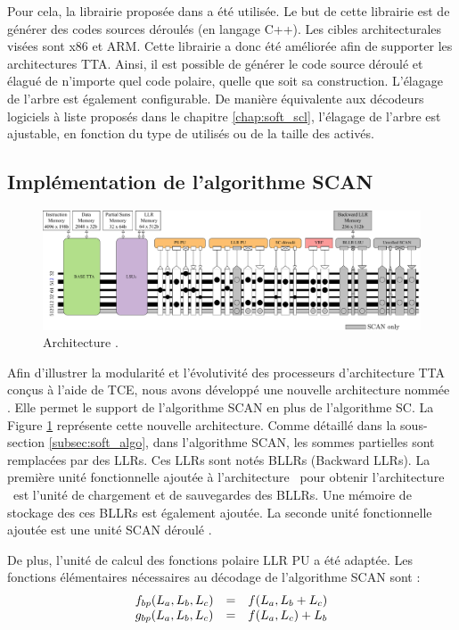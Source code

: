 Pour cela, la librairie proposée dans \cite{cassagne_efficient_2015} a été utilisée. Le but de cette librairie est de générer des codes sources déroulés (en langage C++). Les cibles architecturales visées sont x86 et ARM. Cette librairie a donc été améliorée afin de supporter les architectures TTA. Ainsi, il est possible de générer le code source déroulé et élagué de n'importe quel code polaire, quelle que soit sa construction. L'élagage de l'arbre est également configurable. De manière équivalente aux décodeurs logiciels à liste proposés dans le chapitre \ref{chap:soft_scl}, l'élagage de l'arbre est ajustable, en fonction du type de \noeuds utilisés ou de la taille des \noeuds activés.


\subsection{Implémentation de l'algorithme SCAN}

\begin{figure}[t]
	\centering
	\includegraphics[width=\textwidth]{main/ch4_fig/archi_scan}
	\caption{Architecture \TTSCAN.}
	\label{fig:tt_scan}
\end{figure}

Afin d'illustrer la modularité et l'évolutivité des processeurs d'architecture TTA conçus à l'aide de TCE, nous avons développé une nouvelle architecture nommée \TTSCAN. Elle permet le support de l'algorithme SCAN en plus de l'algorithme SC. La Figure \ref{fig:tt_scan} représente cette nouvelle architecture.
Comme détaillé dans la sous-section \ref{subsec:soft_algo}, dans l'algorithme SCAN, les sommes partielles sont remplacées par des LLRs. Ces LLRs sont notés BLLRs (Backward LLRs). La première unité fonctionnelle ajoutée à l'architecture \TTSC~pour obtenir l'architecture \TTSCAN~est l'unité de chargement et de sauvegardes des BLLRs. Une mémoire de stockage des ces BLLRs est également ajoutée. La seconde unité fonctionnelle ajoutée est une unité \og SCAN déroulé \fg. 

De plus, l'unité de calcul des fonctions polaire LLR PU a été adaptée. Les fonctions élémentaires nécessaires au décodage de l'algorithme SCAN sont : 
\begin{eqnarray}
  \begin{array}{l c l}
    f_{bp}(L_a,L_b,L_c) & = & f(L_a, L_b  + L_c) \\
    g_{bp}(L_a,L_b,L_c) & = & f(L_a, L_c) + L_b
  \end{array}
  \label{eq:bp}
\end{eqnarray}

